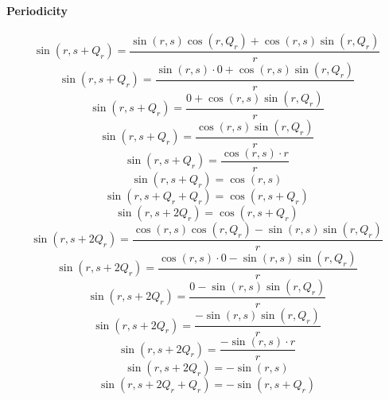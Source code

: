 \documentclass[a4paper,12pt]{report}
\begin{document}
\paragraph{Periodicity}
\begin{equation}
\sin(r,s + Q_r) = \frac{\sin(r,s) \cos(r,Q_r) + \cos(r,s) \sin(r,Q_r)}{r}
\end{equation}
\begin{equation}
\sin(r,s + Q_r) = \frac{\sin(r,s) \cdot 0 + \cos(r,s) \sin(r,Q_r)}{r}
\end{equation}
\begin{equation}
\sin(r,s + Q_r) = \frac{0 + \cos(r,s) \sin(r,Q_r)}{r}
\end{equation}
\begin{equation}
\sin(r,s + Q_r) = \frac{\cos(r,s) \sin(r,Q_r)}{r}
\end{equation}
\begin{equation}
\sin(r,s + Q_r) = \frac{\cos(r,s) \cdot r}{r}
\end{equation}
\begin{equation}
\sin(r,s + Q_r) = \cos(r,s)
\end{equation}
\begin{equation}
\sin(r,s + Q_r + Q_r) = \cos(r,s + Q_r)
\end{equation}
\begin{equation}
\sin(r,s + 2Q_r) = \cos(r,s + Q_r)
\end{equation}
\begin{equation}
\sin(r,s + 2Q_r) = \frac{\cos(r,s) \cos(r,Q_r) - \sin(r,s) \sin(r,Q_r)}{r}
\end{equation}
\begin{equation}
\sin(r,s + 2Q_r) = \frac{\cos(r,s) \cdot 0 - \sin(r,s) \sin(r,Q_r)}{r}
\end{equation}
\begin{equation}
\sin(r,s + 2Q_r) = \frac{0 - \sin(r,s) \sin(r,Q_r)}{r}
\end{equation}
\begin{equation}
\sin(r,s + 2Q_r) = \frac{-\sin(r,s) \sin(r,Q_r)}{r}
\end{equation}
\begin{equation}
\sin(r,s + 2Q_r) = \frac{-\sin(r,s) \cdot r}{r}
\end{equation}
\begin{equation}
\sin(r,s + 2Q_r) = -\sin(r,s)
\end{equation}
\begin{equation}
\sin(r,s + 2Q_r + Q_r) = -\sin(r,s + Q_r)
\end{equation}
\end{document}
